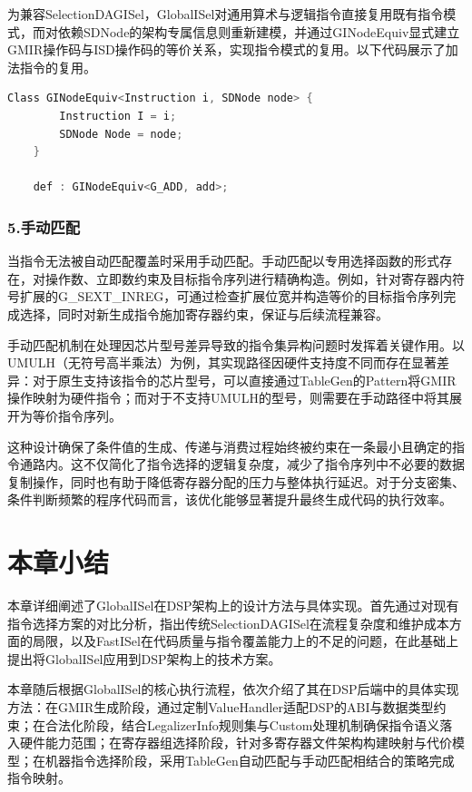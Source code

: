 \par

为兼容SelectionDAGISel，GlobalISel对通用算术与逻辑指令直接复用既有指令模式，而对依赖SDNode的架构专属信息则重新建模，并通过GINodeEquiv显式建立GMIR操作码与ISD操作码的等价关系，实现指令模式的复用。以下代码展示了加法指令的复用。

\lstset{language=c++}
\begin{lstlisting}[language=C++]
	Class GINodeEquiv<Instruction i, SDNode node> {
		Instruction I = i;
		SDNode Node = node;
	}
	
	def : GINodeEquiv<G_ADD, add>;
\end{lstlisting}


\subsubsection{5.手动匹配}
当指令无法被自动匹配覆盖时采用手动匹配。手动匹配以专用选择函数的形式存在，对操作数、立即数约束及目标指令序列进行精确构造。例如，针对寄存器内符号扩展的G\_SEXT\_INREG，可通过检查扩展位宽并构造等价的目标指令序列完成选择，同时对新生成指令施加寄存器约束，保证与后续流程兼容。

\par

手动匹配机制在处理因芯片型号差异导致的指令集异构问题时发挥着关键作用。以UMULH（无符号高半乘法）为例，其实现路径因硬件支持度不同而存在显著差异：对于原生支持该指令的芯片型号，可以直接通过TableGen的Pattern将GMIR操作映射为硬件指令；而对于不支持UMULH的型号，则需要在手动路径中将其展开为等价指令序列。

\par

这种设计确保了条件值的生成、传递与消费过程始终被约束在一条最小且确定的指令通路内。这不仅简化了指令选择的逻辑复杂度，减少了指令序列中不必要的数据复制操作，同时也有助于降低寄存器分配的压力与整体执行延迟。对于分支密集、条件判断频繁的程序代码而言，该优化能够显著提升最终生成代码的执行效率。


\section{本章小结}
本章详细阐述了GlobalISel在DSP架构上的设计方法与具体实现。首先通过对现有指令选择方案的对比分析，指出传统SelectionDAGISel在流程复杂度和维护成本方面的局限，以及FastISel在代码质量与指令覆盖能力上的不足的问题，在此基础上提出将GlobalISel应用到DSP架构上的技术方案。

\par

本章随后根据GlobalISel的核心执行流程，依次介绍了其在DSP后端中的具体实现方法：在GMIR生成阶段，通过定制ValueHandler适配DSP的ABI与数据类型约束；在合法化阶段，结合LegalizerInfo规则集与Custom处理机制确保指令语义落入硬件能力范围；在寄存器组选择阶段，针对多寄存器文件架构构建映射与代价模型；在机器指令选择阶段，采用TableGen自动匹配与手动匹配相结合的策略完成指令映射。
